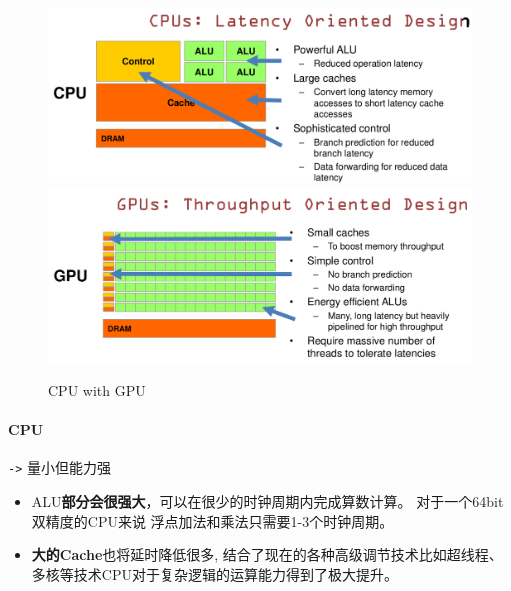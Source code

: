 \documentclass[UTF8,a4paper,12pt]{ctexbook}
\begin{document}
			\begin{figure}[H]
				\centering
				\includegraphics[scale=0.4]{CpuWithGpu}
				\includegraphics[scale=0.4]{CpuWithGpu2}
				\caption{CPU with GPU}
			\end{figure}
		
			\paragraph{CPU}\verb|->|
					量小但能力强
					\begin{itemize}
						\item 	ALU\textbf{部分会很强大}，可以在很少的时钟周期内完成算数计算。 对于一个64bit双精度的CPU来说 浮点加法和乘法只需要1-3个时钟周期。 							
						\item 	\textbf{大的Cache}也将延时降低很多, 结合了现在的各种高级调节技术比如超线程、多核等技术CPU对于复杂逻辑的运算能力得到了极大提升。
					\end{itemize}
			
\end{document}
